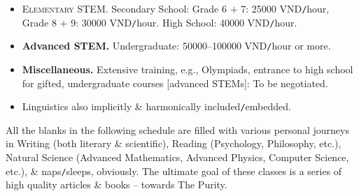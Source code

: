 \documentclass[landscape,a4paper]{article}
\begin{document}
\begin{itemize}
	\item \textsc{Elementary STEM.} Secondary School: Grade 6 $+$ 7: 25000 VND\texttt{/}hour, Grade 8 $+$ 9: 30000 VND\texttt{/}hour. High School: 40000 VND\texttt{/}hour.
	\item \textbf{Advanced STEM.} Undergraduate: 50000--100000 VND\texttt{/}hour or more.
	\item \textbf{Miscellaneous.} Extensive training, e.g., Olympiads, entrance to high school for gifted, undergraduate courses [advanced STEMs]: To be negotiated.
	\item Linguistics also implicitly \& harmonically included\texttt{/}embedded.
\end{itemize}
All the blanks in the following schedule are filled with various personal journeys in Writing (both literary \& scientific), Reading (Psychology, Philosophy, etc.), Natural Science (Advanced Mathematics, Advanced Physics, Computer Science, etc.), \& naps\texttt{/}sleeps, obviously. The ultimate goal of these classes is a series of high quality articles \& books -- towards The Purity.
\cleardoublepage
\CellHeight{.4in}
\CellWidth{1.4in}
\TextSize{\normalsize}
\SevenDay
\TwentyFourHour
{}
\begin{schedule}
\end{schedule}
\end{document}
